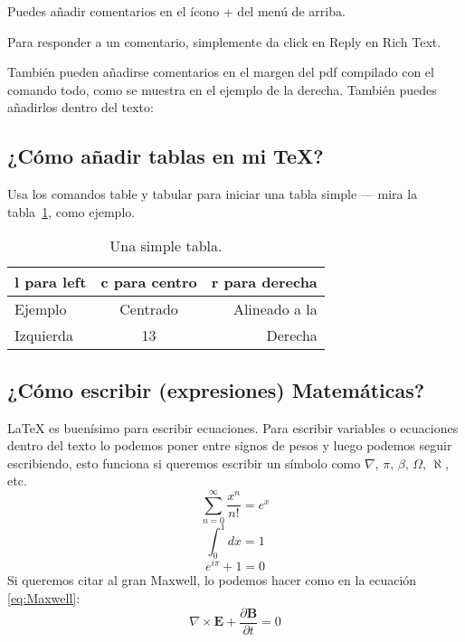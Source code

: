 \documentclass[12pt]{article}
\begin{document}
Puedes añadir comentarios en el ícono + del menú de arriba.

Para responder a un comentario, simplemente da click en Reply en Rich Text.

También pueden añadirse comentarios en el margen del pdf compilado con el comando todo, como se muestra en el ejemplo de la derecha. También puedes añadirlos dentro del texto:

\subsection{¿Cómo añadir tablas en mi \TeX?}

Usa los comandos table y tabular para iniciar una tabla simple --- mira la tabla~\ref{tab:tabla ejemplo}, como ejemplo. 

\begin{table}
\centering
\begin{tabular}{l c r} 
l para left & c para centro & r para derecha \\ \hline
Ejemplo & Centrado & Alineado a la\\
Izquierda & 13 & Derecha
\end{tabular}
\caption{\label{tab:tabla ejemplo}Una simple tabla.}
\end{table}

\subsection{¿Cómo escribir (expresiones) Matemáticas?}

\LaTeX{} es buenísimo para escribir ecuaciones. Para escribir variables o ecuaciones dentro del texto lo podemos poner entre signos de pesos y luego podemos seguir escribiendo, esto funciona si queremos escribir un símbolo como $\nabla$, $\pi$, $\beta$, $\Omega$, $\aleph$, etc.
\begin{equation}
\sum_{n=0}^\infty \frac{x^n}{n!}=e^x
\end{equation}
\begin{equation}
\int_{0}^{1}dx=1
\end{equation}
\begin{equation}
e^{i\pi}+1=0
\end{equation}
Si queremos citar al gran Maxwell, lo podemos hacer como en la ecuación \ref{eq:Maxwell}:
\begin{equation}
\nabla\times\mathbf{E}+\frac{\partial\mathbf{B}}{\partial t}=0\label{eq:Maxwell}
\end{equation}
\end{document}
